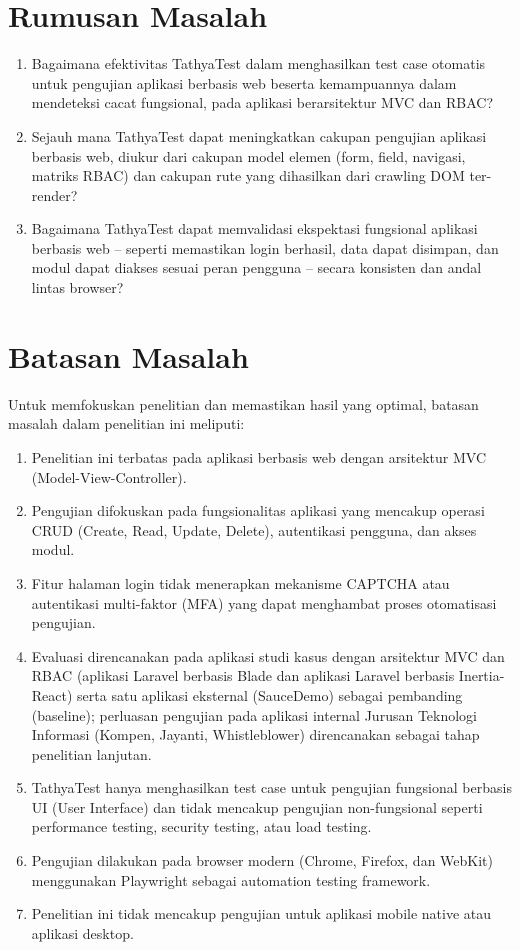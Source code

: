 \section{Rumusan Masalah}\label{rumusan-masalah}

\begin{enumerate}
    \item Bagaimana efektivitas TathyaTest dalam menghasilkan test case otomatis untuk pengujian aplikasi berbasis web beserta kemampuannya dalam mendeteksi cacat fungsional, pada aplikasi berarsitektur MVC dan RBAC?
    \item Sejauh mana TathyaTest dapat meningkatkan cakupan pengujian aplikasi berbasis web, diukur dari cakupan model elemen (form, field, navigasi, matriks RBAC) dan cakupan rute yang dihasilkan dari crawling DOM ter-render?
    \item Bagaimana TathyaTest dapat memvalidasi ekspektasi fungsional aplikasi berbasis web -- seperti memastikan login berhasil, data dapat disimpan, dan modul dapat diakses sesuai peran pengguna -- secara konsisten dan andal lintas browser?
\end{enumerate}

\section{Batasan Masalah}\label{batasan-masalah}

Untuk memfokuskan penelitian dan memastikan hasil yang optimal, batasan masalah dalam penelitian ini meliputi:

\begin{enumerate}
    \item Penelitian ini terbatas pada aplikasi berbasis web dengan arsitektur MVC (Model-View-Controller).
    \item Pengujian difokuskan pada fungsionalitas aplikasi yang mencakup operasi CRUD (Create, Read, Update, Delete), autentikasi pengguna, dan akses modul.
    \item Fitur halaman login tidak menerapkan mekanisme CAPTCHA atau autentikasi multi-faktor (MFA) yang dapat menghambat proses otomatisasi pengujian.
    \item Evaluasi direncanakan pada aplikasi studi kasus dengan arsitektur MVC dan RBAC (aplikasi Laravel berbasis Blade dan aplikasi Laravel berbasis Inertia-React) serta satu aplikasi eksternal (SauceDemo) sebagai pembanding (baseline); perluasan pengujian pada aplikasi internal Jurusan Teknologi Informasi (Kompen, Jayanti, Whistleblower) direncanakan sebagai tahap penelitian lanjutan.
    \item TathyaTest hanya menghasilkan test case untuk pengujian fungsional berbasis UI (User Interface) dan tidak mencakup pengujian non-fungsional seperti performance testing, security testing, atau load testing.
    \item Pengujian dilakukan pada browser modern (Chrome, Firefox, dan WebKit) menggunakan Playwright sebagai automation testing framework.
    \item Penelitian ini tidak mencakup pengujian untuk aplikasi mobile native atau aplikasi desktop.
\end{enumerate}

